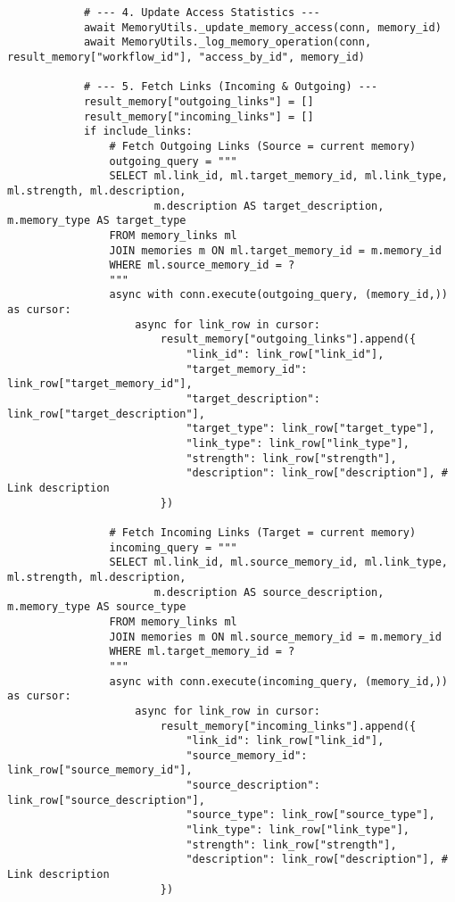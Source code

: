 \documentclass[12pt,a4paper]{article}
\begin{document}
\begin{pageablecode}
\begin{verbatim}
            # --- 4. Update Access Statistics ---
            await MemoryUtils._update_memory_access(conn, memory_id)
            await MemoryUtils._log_memory_operation(conn, result_memory["workflow_id"], "access_by_id", memory_id)

            # --- 5. Fetch Links (Incoming & Outgoing) ---
            result_memory["outgoing_links"] = []
            result_memory["incoming_links"] = []
            if include_links:
                # Fetch Outgoing Links (Source = current memory)
                outgoing_query = """
                SELECT ml.link_id, ml.target_memory_id, ml.link_type, ml.strength, ml.description,
                       m.description AS target_description, m.memory_type AS target_type
                FROM memory_links ml
                JOIN memories m ON ml.target_memory_id = m.memory_id
                WHERE ml.source_memory_id = ?
                """
                async with conn.execute(outgoing_query, (memory_id,)) as cursor:
                    async for link_row in cursor:
                        result_memory["outgoing_links"].append({
                            "link_id": link_row["link_id"],
                            "target_memory_id": link_row["target_memory_id"],
                            "target_description": link_row["target_description"],
                            "target_type": link_row["target_type"],
                            "link_type": link_row["link_type"],
                            "strength": link_row["strength"],
                            "description": link_row["description"], # Link description
                        })

                # Fetch Incoming Links (Target = current memory)
                incoming_query = """
                SELECT ml.link_id, ml.source_memory_id, ml.link_type, ml.strength, ml.description,
                       m.description AS source_description, m.memory_type AS source_type
                FROM memory_links ml
                JOIN memories m ON ml.source_memory_id = m.memory_id
                WHERE ml.target_memory_id = ?
                """
                async with conn.execute(incoming_query, (memory_id,)) as cursor:
                    async for link_row in cursor:
                        result_memory["incoming_links"].append({
                            "link_id": link_row["link_id"],
                            "source_memory_id": link_row["source_memory_id"],
                            "source_description": link_row["source_description"],
                            "source_type": link_row["source_type"],
                            "link_type": link_row["link_type"],
                            "strength": link_row["strength"],
                            "description": link_row["description"], # Link description
                        })


\end{verbatim}
\end{pageablecode}
\end{document}
